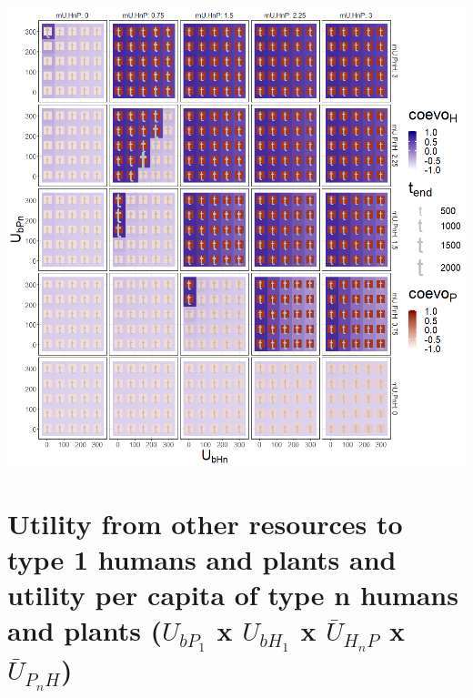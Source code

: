 \documentclass[]{book}
\begin{document}
\newpage

\includegraphics[width=1\linewidth]{plots/4_fourPar-U.bn-mUn_plot}

\newpage

\hypertarget{utility-from-other-resources-to-type-1-humans-and-plants-and-utility-per-capita-of-type-n-humans-and-plants-u_bp_1-x-u_bh_1-x-baru_h_np-x-baru_p_nh}{%
\section{\texorpdfstring{Utility from other resources to type 1 humans and plants and utility per capita of type n humans and plants (\(U_{bP_{1}}\) x \(U_{bH_{1}}\) x \(\bar{U}_{H_{n}P}\) x \(\bar{U}_{P_{n}H}\))}{Utility from other resources to type 1 humans and plants and utility per capita of type n humans and plants (U\_\{bP\_\{1\}\} x U\_\{bH\_\{1\}\} x \textbackslash{}bar\{U\}\_\{H\_\{n\}P\} x \textbackslash{}bar\{U\}\_\{P\_\{n\}H\})}}\label{utility-from-other-resources-to-type-1-humans-and-plants-and-utility-per-capita-of-type-n-humans-and-plants-u_bp_1-x-u_bh_1-x-baru_h_np-x-baru_p_nh}}

\end{document}

